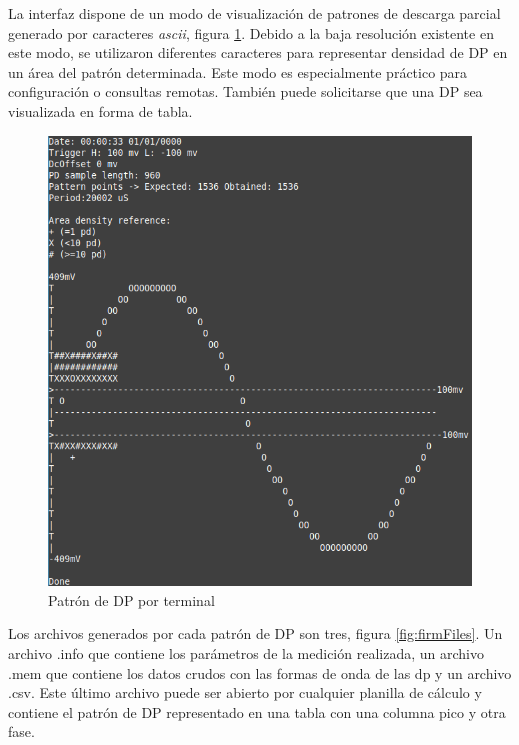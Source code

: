 La interfaz dispone de un modo de visualización de patrones de descarga parcial generado por caracteres \textit{ascii}, figura \ref{fig:firmInterfaz}. Debido a la baja resolución existente en este modo, se utilizaron diferentes caracteres para representar densidad de DP en un área del patrón determinada. Este modo es especialmente práctico para configuración o consultas remotas. También puede solicitarse que una DP sea visualizada en forma de tabla.

\vspace{5mm}

\begin{figure}[ht]
	\centering
	\includegraphics[width=130mm]{./Figures/firmInterfaz.png}
	\caption{Patrón de DP por terminal}
	\label{fig:firmInterfaz}
\end{figure}

\vspace{10mm}

Los archivos generados por cada patrón de DP son tres, figura \ref{fig:firmFiles}. Un archivo .info que contiene los parámetros de la medición realizada, un archivo .mem que contiene los datos crudos con las formas de onda de las dp y un archivo .csv. Este último archivo puede ser abierto por cualquier planilla de cálculo y contiene el patrón de DP representado en una tabla con una columna pico y otra fase.

